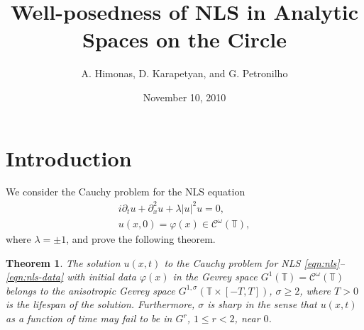 \documentclass[12pt,reqno]{amsart}
\numberwithin{equation}{section}  %
\numberwithin{figure}{section}
\theoremstyle{plain}
\newtheorem{theorem}{Theorem}
\theoremstyle{definition}
\theoremstyle{remark}
\begin{document}
\title{Well-posedness of NLS in Analytic Spaces on the Circle}
\author{A. Himonas, D. Karapetyan, and G. Petronilho}
\date{November 10, 2010}
%
\maketitle
%
%
%
%
%
\section{Introduction}
\label{sec:introduction}
We consider the Cauchy problem for the NLS equation
%
\begin{gather}
  \label{eqn:nls}
  i\partial_tu+\partial_x^2u+\lambda |u|^2u=0,
  \\
  \label{eqn:nls-data}
  u(x,0)=\varphi(x) \in \mathcal{C}^\omega(\mathbb{T}),
\end{gather}
%
where $\lambda =\pm 1$, and prove the following theorem.
%
\begin{theorem}
  \label{thm:nls-analyt}
  The solution $u(x,t)$  to the Cauchy problem for NLS \eqref{eqn:nls}--
  \eqref{eqn:nls-data}  with   initial data $\varphi(x)$  in  the Gevrey space
  $G^1(\mathbb{T})=\mathcal{C}^\omega(\mathbb{T})$ belongs to the anisotropic
  Gevrey space $G^{1, \sigma}( \mathbb{T}\times [-T, T])$,  $\sigma \ge 2$, where
  $T>0$ is the lifespan of the solution. Furthermore, $\sigma$ is sharp in the
  sense that $u(x,t)$ as a function of  time  may fail to be in $G^r$, $1\le
  r<2$, near $0$.
\end{theorem}
%
%
%
%
\end{document}
